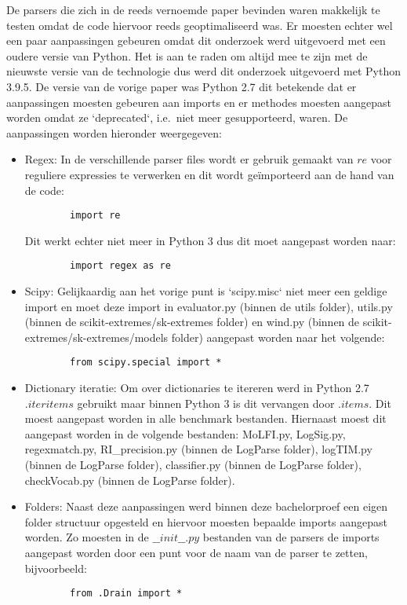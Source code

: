 De parsers die zich in de reeds vernoemde paper bevinden waren makkelijk te testen omdat de code hiervoor reeds geoptimaliseerd was. Er moesten echter wel een paar aanpassingen gebeuren omdat dit onderzoek werd uitgevoerd met een oudere versie van Python. Het is aan te raden om altijd mee te zijn met de nieuwste versie van de technologie dus werd dit onderzoek uitgevoerd met Python 3.9.5. De versie van de vorige paper was Python 2.7 dit betekende dat er aanpassingen moesten gebeuren aan imports en er methodes moesten aangepast worden omdat ze `deprecated`, i.e.\ niet meer gesupporteerd, waren. De aanpassingen worden hieronder weergegeven:
\begin{itemize}
    \item Regex: In de verschillende parser files wordt er gebruik gemaakt van $re$ voor reguliere expressies te verwerken en dit wordt geïmporteerd aan de hand van de code: 
    \begin{verbatim}
        import re
    \end{verbatim}
    Dit werkt echter niet meer in Python 3 dus dit moet aangepast worden naar:
    \begin{verbatim}
        import regex as re
    \end{verbatim}

    \item Scipy: Gelijkaardig aan het vorige punt is `scipy.misc` niet meer een geldige import en moet deze import in evaluator.py (binnen de utils folder), utils.py (binnen de scikit-extremes/sk-extremes folder) en wind.py (binnen de scikit-extremes/sk-extremes/models folder) aangepast worden naar het volgende:
    \begin{verbatim}
        from scipy.special import *
    \end{verbatim}

    \item Dictionary iteratie: Om over dictionaries te itereren werd in Python 2.7 $.iteritems$ gebruikt maar binnen Python 3 is dit vervangen door $.items$. Dit moest aangepast worden in alle benchmark bestanden. Hiernaast moest dit aangepast worden in de volgende bestanden: MoLFI.py, LogSig.py, regexmatch.py, RI\_precision.py (binnen de LogParse folder), logTIM.py (binnen de LogParse folder), classifier.py (binnen de LogParse folder), checkVocab.py (binnen de LogParse folder).\\
    
    \item Folders: Naast deze aanpassingen werd binnen deze bachelorproef een eigen folder structuur opgesteld en hiervoor moesten bepaalde imports aangepast worden. Zo moesten in de $\_\_init\_\_.py$ bestanden van de parsers de imports aangepast worden door een punt voor de naam van de parser te zetten, bijvoorbeeld:
    \begin{verbatim}
        from .Drain import *
    \end{verbatim}
\end{itemize}

